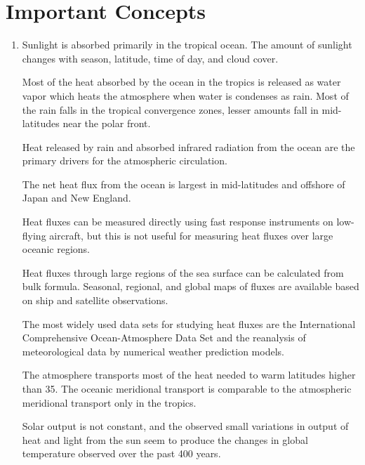 \section{Important Concepts}
\begin{enumerate}
\item Sunlight is absorbed primarily in the tropical ocean. The amount
of sunlight changes with season, latitude, time of day, and cloud
cover.

\vitem Most of the heat absorbed by the ocean in the tropics is
released as water vapor which heats the atmosphere when water is
condenses as rain. Most of the rain falls in the tropical convergence
zones, lesser amounts fall in mid-latitudes near the polar front.

\vitem Heat released by rain and absorbed infrared radiation from the
ocean are the primary drivers for the atmospheric circulation.

\vitem The net heat flux from the ocean is
largest in mid-latitudes and offshore of Japan and New England.

\vitem Heat fluxes can be measured directly using fast response
instruments on low-flying aircraft, but this is not useful for
measuring heat fluxes over large
oceanic regions.

\vitem Heat fluxes through large regions of the sea surface can be
calculated from bulk formula. Seasonal, regional, and global maps of
fluxes are available based on ship and satellite observations.

\vitem The most widely used data sets for studying heat
fluxes are the International
Comprehensive Ocean-Atmosphere Data Set and the reanalysis of
meteorological data by numerical weather prediction models.

\vitem The atmosphere transports most of the
heat needed to warm latitudes higher than
35\degrees. The oceanic meridional transport is comparable to the
atmospheric meridional transport only in the tropics.

\vitem Solar output is not constant, and the observed small variations
in output of heat and light from the sun seem to produce the changes
in global temperature observed over the past 400 years.
\end{enumerate}


